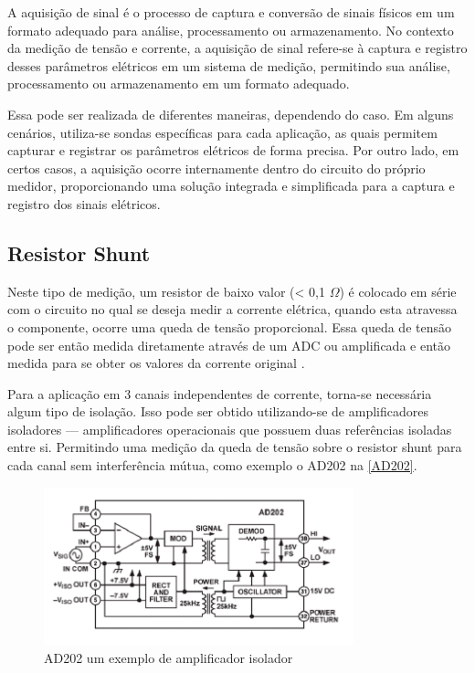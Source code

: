 
A aquisição de sinal é o processo de captura e conversão de sinais físicos em um formato adequado para análise, processamento ou armazenamento. No contexto da medição de tensão e corrente, a aquisição de sinal refere-se à captura e registro desses parâmetros elétricos em um sistema de medição, permitindo sua análise, processamento ou armazenamento em um formato adequado.

Essa pode ser realizada de diferentes maneiras, dependendo do caso. Em alguns cenários, utiliza-se sondas específicas para cada aplicação, as quais permitem capturar e registrar os parâmetros elétricos de forma precisa. Por outro lado, em certos casos, a aquisição ocorre internamente dentro do circuito do próprio medidor, proporcionando uma solução integrada e simplificada para a captura e registro dos sinais elétricos.

\subsection{Resistor Shunt}\label{subsec:resiShunt}
Neste tipo de medição, um resistor de baixo valor (< 0,1 $\Omega$) é colocado em série com o circuito no qual se deseja medir a corrente elétrica, quando esta atravessa o componente, ocorre uma queda de tensão proporcional. Essa queda de tensão pode ser então medida diretamente através de um \gls{ADC} ou amplificada e então medida para se obter os valores da corrente original \citep{curr_sens_tech}.

Para a aplicação em 3 canais independentes de corrente, torna-se necessária algum tipo de isolação. Isso pode ser obtido utilizando-se de amplificadores isoladores --- amplificadores operacionais que possuem duas referências isoladas entre si. Permitindo uma medição da queda de tensão sobre o resistor shunt para cada canal sem interferência mútua, como exemplo o AD202 na \autoref{AD202}.

\begin{figure}[htb!]
    \caption{AD202 um exemplo de amplificador isolador}
    \label{AD202}
    \includegraphics[width=0.8\textwidth]{figuras/AD202-ampop-isolado.png}
\end{figure}

